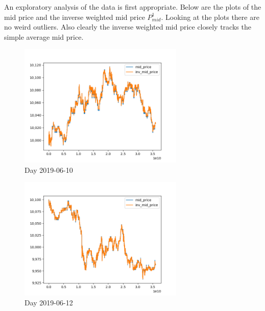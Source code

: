 \documentclass[english, 11pt, a4paper]{article}
\begin{document}
An exploratory analysis of the data is first appropriate. Below are the plots of the mid price and
the inverse weighted mid price $P_{mid}^1$. Looking at the plots there are no weird outliers. Also
clearly the inverse weighted mid price closely tracks the simple average mid price. 
\begin{figure}[H] 
	\centering
	\includegraphics[width=0.70\textwidth]{../data/figures/time_series_20190610_mid_price_inv_mid_price.png}
	\caption{Day 2019-06-10}
	\label{fig2}
\end{figure}

\begin{figure}[H] 
	\centering
	\includegraphics[width=0.70\textwidth]{../data/figures/time_series_20190612_mid_price_inv_mid_price.png}
	\caption{Day 2019-06-12}
	\label{fig3}
\end{figure}
\end{document}

